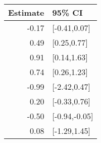 \begin{tabular}{rl}
  \hline
Estimate & 95\% CI \\ 
  \hline
-0.17 & [-0.41,0.07] \\ 
  0.49 & [0.25,0.77] \\ 
  0.91 & [0.14,1.63] \\ 
  0.74 & [0.26,1.23] \\ 
  -0.99 & [-2.42,0.47] \\ 
  0.20 & [-0.33,0.76] \\ 
  -0.50 & [-0.94,-0.05] \\ 
  0.08 & [-1.29,1.45] \\ 
   \hline
\end{tabular}

